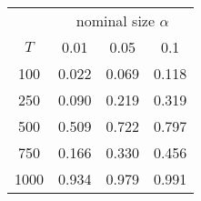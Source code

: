 % 
\begin{tabular}{cccc}
  \hline
  & \multicolumn{3}{c}{nominal size $\alpha$} \\
 $T$ & 0.01 & 0.05 & 0.1 \\
 \hline
100 & 0.022 & 0.069 & 0.118 \\ 
  250 & 0.090 & 0.219 & 0.319 \\ 
  500 & 0.509 & 0.722 & 0.797 \\ 
  750 & 0.166 & 0.330 & 0.456 \\ 
  1000 & 0.934 & 0.979 & 0.991 \\ 
   \hline
\end{tabular}
